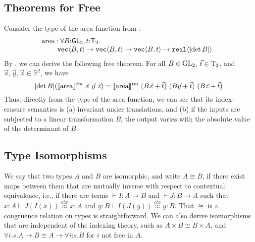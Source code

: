 
\subsection{Theorems for Free}
\label{sec:theorems-for-free}

Consider the type of the area %
function from
:
\begin{displaymath}
  \begin{array}{@{}l}
    \mathrm{area} : \forall B\mathord:\SynGL{2}, t\mathord:\SynTransl{2}.\ \\
    \hspace{0.8cm}\tyPrim{vec}{B, t} \to \tyPrim{vec}{B, t} \to \tyPrim{vec}{B, t} \to \tyPrim{real}{\abs{\det B}}
  \end{array}
\end{displaymath}
By , we can derive the following free theorem. For all $B \in \mathrm{GL}_2$, $\vec{t} \in \mathrm{T}_2$, and $\vec{x}, \vec{y}, \vec{z} \in \mathbb{R}^2$, we have 
\begin{displaymath}
  \abs{\det B}(\tmSem{\mathrm{area}}\ \vec{x}\ \vec{y}\ \vec{z}) = \tmSem{\mathrm{area}}\ (B\vec{x} + \vec{t})\ (B\vec{y} + \vec{t})\ (B\vec{z} + \vec{t})
\end{displaymath}
Thus, directly from the type of the $\mathrm{area}$ function, we can
see that its index-erasure semantics is (a) invariant under
translations, and (b) if the inputs are subjected to a linear
transformation $B$, the output varies with the absolute value of the
determinant of $B$.




\subsection{Type Isomorphisms}
\label{sec:types-indexed-abelian-groups}
We say that two types $A$ and $B$ are isomorphic, and write $A \cong
B$, if there exist maps between them that are mutually inverse with
respect to contextual equivalence, i.e., if there are terms $\vdash I
: A \to B$ and $\vdash J : B\to A$ such that $x:A\vdash
J(I(x))\stackrel{ctx}\approx x : A$ and $y:B\vdash
I(J(y))\stackrel{ctx}\approx y : B$.
That $\cong$ is a congruence relation on types is straightforward. We
can also derive isomorphisms that are independent of the indexing
theory, such as $A\times B \cong B \times A$, and $\forall
i\mathord:s.A\to B\cong A\to\forall i\mathord:s.B$ for $i$ not free in
$A$.


